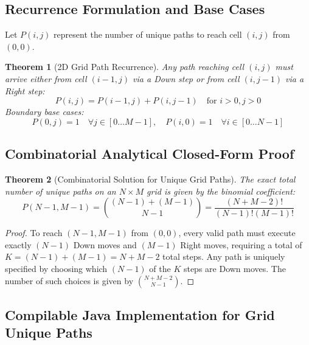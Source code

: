 \documentclass[10pt,journal,compsoc,onecolumn]{IEEEtran}
\newtheorem{theorem}{Theorem}
\begin{document}
\subsection{Recurrence Formulation and Base Cases}

Let $P(i, j)$ represent the number of unique paths to reach cell $(i, j)$ from $(0, 0)$.

\begin{theorem}[2D Grid Path Recurrence]
Any path reaching cell $(i, j)$ must arrive either from cell $(i-1, j)$ via a Down step or from cell $(i, j-1)$ via a Right step:
\[
P(i, j) = P(i-1, j) + P(i, j-1) \quad \text{for } i > 0, j > 0
\]
Boundary base cases:
\[
P(0, j) = 1 \quad \forall j \in [0 \dots M-1], \quad P(i, 0) = 1 \quad \forall i \in [0 \dots N-1]
\]
\end{theorem}

\subsection{Combinatorial Analytical Closed-Form Proof}

\begin{theorem}[Combinatorial Solution for Unique Grid Paths]
The exact total number of unique paths on an $N \times M$ grid is given by the binomial coefficient:
\[
P(N-1, M-1) = \binom{(N-1) + (M-1)}{N-1} = \frac{(N + M - 2)!}{(N - 1)! (M - 1)!}
\]
\end{theorem}

\begin{proof}
To reach $(N-1, M-1)$ from $(0, 0)$, every valid path must execute exactly $(N-1)$ Down moves and $(M-1)$ Right moves, requiring a total of $K = (N - 1) + (M - 1) = N + M - 2$ total steps. Any path is uniquely specified by choosing which $(N-1)$ of the $K$ steps are Down moves. The number of such choices is given by $\binom{N+M-2}{N-1}$.
\end{proof}

\subsection{Compilable Java Implementation for Grid Unique Paths}
\end{document}
